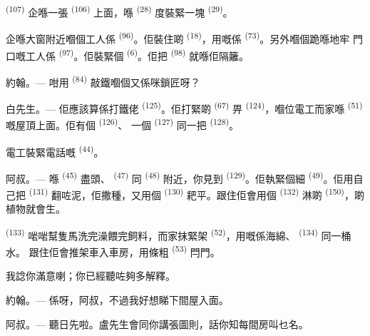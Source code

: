  \textsuperscript{(107)} 企喺一張 \textsuperscript{(106)}
上面，喺 \textsuperscript{(28)} 度裝緊一塊
\textsuperscript{(29)}。

企喺大窗附近嗰個工人係 \textsuperscript{(96)}。佢裝住啲
\textsuperscript{(18)}，用嘅係 \textsuperscript{(73)}。另外嗰個跪喺地牢
門口嘅工人係 \textsuperscript{(97)}。佢裝緊個
\textsuperscript{(6)}。佢把 \textsuperscript{(98)} 就喺佢隔籬。

\textsc{約翰}。--- 咁用 \textsuperscript{(84)} 敲鐵嗰個又係咪鎖匠呀？

\textsc{白先生}。--- 佢應該算係打鐵佬 \textsuperscript{(125)}。佢打緊啲
\textsuperscript{(67)} 畀 \textsuperscript{(124)}，嗰位電工而家喺
 \textsuperscript{(51)} 嘅屋頂上面。佢有個 \textsuperscript{(126)}、
一個 \textsuperscript{(127)} 同一把 \textsuperscript{(128)}。

電工裝緊電話嘅 \textsuperscript{(44)}。

\VUsaut{3.0mm}

\textsc{阿叔}。--- 喺 \textsuperscript{(45)} 盡頭、
\textsuperscript{(47)} 同 \textsuperscript{(48)} 附近，你見到
\textsuperscript{(129)}。佢執緊個細 \textsuperscript{(49)}。佢用自己把
 \textsuperscript{(131)} 翻咗泥，佢撒種，又用個
\textsuperscript{(130)} 耙平。跟住佢會用個 \textsuperscript{(132)} 淋啲
 \textsuperscript{(150)}，啲植物就會生。

 \textsuperscript{(133)} 啱啱幫隻馬洗完澡餵完飼料，而家抹緊架
\textsuperscript{(52)}，用嘅係海綿、 \textsuperscript{(134)} 同一桶水。
跟住佢會推架車入車房，用條粗 \textsuperscript{(53)} 閂門。

我諗你滿意喇；你已經聽咗夠多解釋。

\textsc{約翰}。--- 係呀，阿叔，不過我好想睇下間屋入面。

\textsc{阿叔}。--- 聽日先啦。盧先生會同你講張圖則，話你知每間房叫乜名。

\VUsaut{3.0mm}
\VUsaut{2.4mm}

